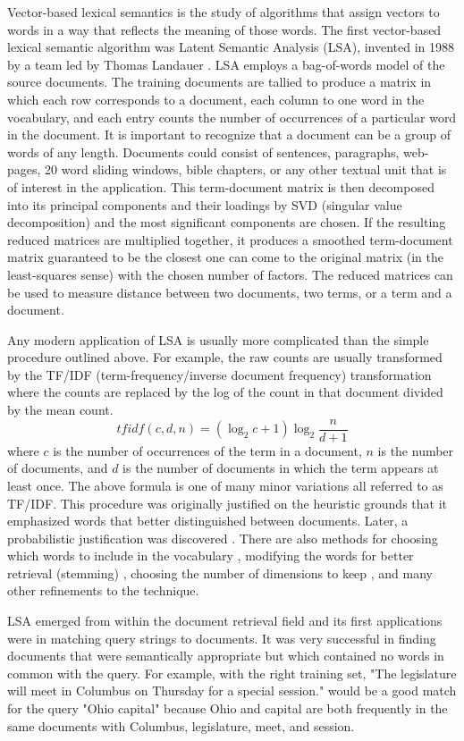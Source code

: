 Vector-based lexical semantics is the study of algorithms that assign vectors to 
words in a way that reflects the meaning of those words. The first vector-based 
lexical semantic algorithm was Latent Semantic Analysis (LSA), invented in 
1988 by a team led by Thomas Landauer \citep{Dumais1988}. LSA employs a bag-of-words model of 
the source documents. The training documents are tallied to produce a matrix in which each 
row corresponds to a document, each column to one word in the vocabulary, and 
each entry counts the number of occurrences of a particular word in the 
document. It is important to recognize that a document can be a group of words 
of any length. Documents could consist of sentences, paragraphs, web-pages, 20 
word sliding windows, bible chapters, or any other textual unit that is of 
interest in the application. This term-document matrix is then decomposed into 
its principal components and their loadings by SVD (singular value 
decomposition) and the most significant components are chosen. If the resulting 
reduced matrices are multiplied together, it produces a smoothed term-document 
matrix guaranteed to be the closest one can come to the original matrix (in the 
least-squares sense) with the chosen number of factors. The reduced matrices
can be used to measure distance between two documents, two terms, or a term and
a document.

Any modern application of LSA is usually more complicated than the simple 
procedure outlined above. For example, the raw 
counts are usually transformed by the TF/IDF (term-frequency/inverse document 
frequency) transformation where the counts are replaced by the log of the count 
in that document divided by the mean count. 
%
\[tfidf(c,d,n)=\left(\log_2{c+1}\right) \log_2{\frac{n}{d+1}}\]
%
where $c$ is the number of occurrences of the term in a document, $n$ is the 
number of documents, and $d$ is the number of documents in which the term 
appears at least once. The above formula is one of many minor variations 
all referred to as TF/IDF. This procedure was originally justified on the 
heuristic grounds that it emphasized words that better distinguished 
between documents. 
Later, a probabilistic justification was discovered \citep{Hiemstra2000}. There 
are also methods for choosing which words to include in the vocabulary 
, modifying the words for better retrieval (stemming) , 
choosing the number of dimensions to keep , and many other refinements 
to the technique.

LSA emerged from within the document retrieval field and its first applications were in 
matching query strings to documents. It was very successful in finding documents 
that were semantically appropriate but which contained no words in common with 
the query. For example, with the right training set, "The legislature will meet 
in Columbus on Thursday for a special session." would be a good match for the 
query "Ohio capital" because Ohio and capital are both frequently in the same 
documents with Columbus, legislature, meet, and session.

